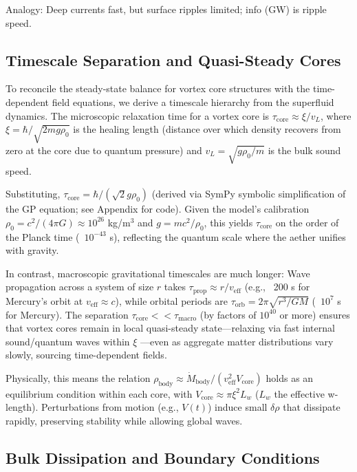 \documentclass{article}
\begin{document}
Analogy: Deep currents fast, but surface ripples limited; info (GW) is ripple speed.

\subsection{Timescale Separation and Quasi-Steady Cores}

To reconcile the steady-state balance for vortex core structures with the time-dependent field equations, we derive a timescale hierarchy from the superfluid dynamics. The microscopic relaxation time for a vortex core is $\tau_{\text{core}} \approx \xi / v_L$, where $\xi = \hbar / \sqrt{2 m g \rho_0}$ is the healing length (distance over which density recovers from zero at the core due to quantum pressure) and $v_L = \sqrt{g \rho_0 / m}$ is the bulk sound speed.

Substituting, $\tau_{\text{core}} = \hbar / (\sqrt{2} g \rho_0)$ (derived via SymPy symbolic simplification of the GP equation; see Appendix for code). Given the model's calibration $\rho_0 = c^2 / (4\pi G) \approx 10^{26}$ kg/m$^3$ and $g = m c^2 / \rho_0$, this yields $\tau_{\text{core}}$ on the order of the Planck time (~$10^{-43}$ s), reflecting the quantum scale where the aether unifies with gravity.

In contrast, macroscopic gravitational timescales are much longer: Wave propagation across a system of size $r$ takes $\tau_{\text{prop}} \approx r / v_{\text{eff}}$ (e.g., ~200 s for Mercury's orbit at $v_{\text{eff}} \approx c$), while orbital periods are $\tau_{\text{orb}} = 2\pi \sqrt{r^3 / G M}$ (~$10^{7}$ s for Mercury). The separation $\tau_{\text{core}} << \tau_{\text{macro}}$ (by factors of $10^{40}$ or more) ensures that vortex cores remain in local quasi-steady state---relaxing via fast internal sound/quantum waves within $\xi$ ---even as aggregate matter distributions vary slowly, sourcing time-dependent fields.

Physically, this means the relation $\rho_{\text{body}} \approx \dot{M}_{\text{body}} / (v_{\text{eff}}^2 V_{\text{core}})$ holds as an equilibrium condition within each core, with $V_{\text{core}} \approx \pi \xi^2 L_w$ ($L_w$ the effective w-length). Perturbations from motion (e.g., $V(t)$) induce small $\delta \rho$ that dissipate rapidly, preserving stability while allowing global waves.

\subsection{Bulk Dissipation and Boundary Conditions}
\end{document}
